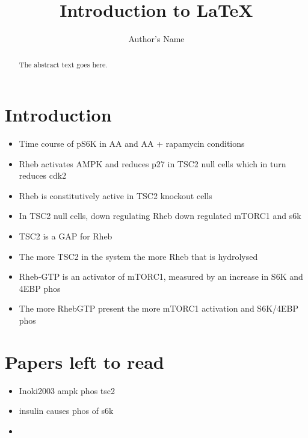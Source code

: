 \documentclass{article}
\begin{document}
\title{Introduction to \LaTeX{}}
\author{Author's Name}

\maketitle

\begin{abstract}
The abstract text goes here.
\end{abstract}

\section{Introduction}

	\begin{itemize}
		\item Time course of pS6K in AA and AA + rapamycin conditions \cite{Patursky-Polischuk2014}
		\item Rheb activates AMPK and reduces p27 in TSC2 null  cells which in turn reduces cdk2 \cite{lacher2010rheb}
		\item Rheb is constitutively active in TSC2 knockout cells \cite{lacher2010rheb}
		\item In TSC2 null cells, down regulating Rheb down regulated mTORC1 and s6k
		\item TSC2 is a GAP for Rheb \cite{Inoki2003}
		\item The more TSC2 in the system the more Rheb that is hydrolysed \cite{Inoki2003}
		\item Rheb-GTP is an activator of mTORC1, measured by an increase in S6K and 4EBP phos
		\item The more RhebGTP present the more mTORC1 activation and S6K/4EBP phos \cite{Inoki2003}
	\end{itemize}


	\cite{Inoki2006}

	\section{Papers left to read}
	\begin{itemize}
		\item Inoki2003 ampk phos tsc2
	\end{itemize}


\begin{itemize}
	\item insulin causes phos of s6k
	\item
\end{itemize}













\end{document}
